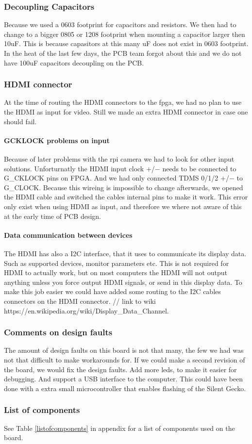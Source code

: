 \subsubsection{Decoupling Capacitors}
Because we used a 0603 footprint for capacitors and resistors.
We then had to change to a bigger 0805 or 1208 footprint when mounting a capacitor larger then 10uF.
This is because capasitors at this many uF does not exist in 0603 footprint.
In the heat of the last few days, the PCB team forgot about this and we do not have 100uF capacitors decoupling on the PCB.

\subsubsection{HDMI connector}
At the time of routing the HDMI connectors to the fpga, we had no plan to use the HDMI as input for video.
Still we made an extra HDMI connector in case one should fail.

\paragraph{GCKLOCK problems on input}
Because of later problems with the rpi camera we had to look for other input solutions.
Unforturnatly the HDMI input clock $+$/$-$ needs to be connected to G\_CKLOCK pins on FPGA.
And we had only connected TDMS 0/1/2 $+$/$-$ to G\_CLOCK.
Because this wireing is impossible to change afterwards, we opened the HDMI cable and switched the cables internal pins to make it work.
This error only exist when using HDMI as input, and therefore we where not aware of this at the early time of PCB design.

\paragraph{Data communication between devices}
The HDMI has also a I2C interface, that it uses to communicate its display data.
Such as supported devices, monitor parameters etc.
This is not required for HDMI to actually work, but on most computers the HDMI will not output anything unless you force output HDMI signals, or send in this display data.
To make this job easier we could have added some routing to the I2C cables connectors on the HDMI connector.
// link to wiki https://en.wikipedia.org/wiki/Display\_Data\_Channel.

\subsubsection{Comments on design faults}
The amount of design faults on this board is not that many, the few we had was not that difficult to make workarounds for.
If we could make a second revision of the board, we would fix the design faults.
Add more leds, to make it easier for debugging.
And support a USB interface to the computer.
This could have been done with a extra small microcontroller that enables flashing of the Silent Gecko.

\subsubsection{List of components}
See Table \ref{listofcomponents} in appendix for a list of components used on the board.

